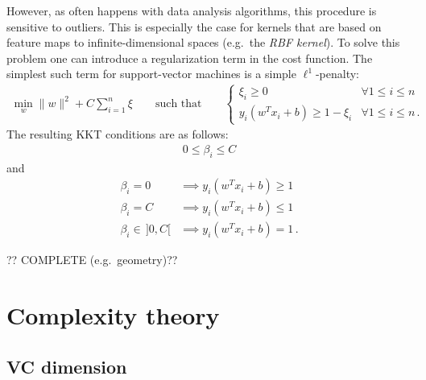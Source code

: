     However, as often happens with data analysis algorithms, this procedure is sensitive to outliers. This is especially the case for kernels that are based on feature maps to infinite-dimensional spaces (e.g.~the \textit{RBF kernel}). To solve this problem one can introduce a regularization term in the cost function. The simplest such term for support-vector machines is a simple $\ell^1$-penalty:
    \begin{gather}
        \min_w\|w\|^2 + C\sum_{i=1}^n\xi \qquad\text{such that}\qquad
        \begin{cases}
            \xi_i\geq0&\forall 1\leq i\leq n\\
            y_i(w^Tx_i+b)\geq1-\xi_i&\forall 1\leq i\leq n\,.
        \end{cases}
    \end{gather}
    The resulting KKT conditions are as follows:
    \begin{gather}
        0\leq\beta_i\leq C
    \end{gather}
    and
    \begin{align}
        \beta_i = 0&\implies y_i(w^Tx_i+b)\geq1\\
        \beta_i = C&\implies y_i(w^Tx_i+b)\leq1\\
        \beta_i\in\,]0,C[&\implies y_i(w^Tx_i+b)=1\,.
    \end{align}

    ?? COMPLETE (e.g.~geometry)??

\section{Complexity theory}
\subsection{VC dimension}


